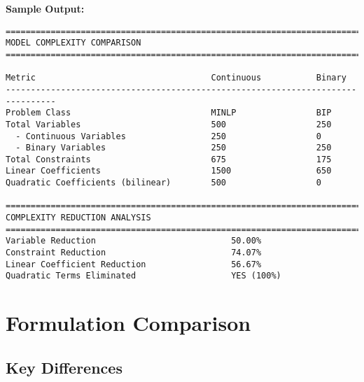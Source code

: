 \documentclass{article}
\begin{document}
\textbf{Sample Output:}
\begin{verbatim}
================================================================================
MODEL COMPLEXITY COMPARISON
================================================================================

Metric                                   Continuous           Binary              
--------------------------------------------------------------------------------
Problem Class                            MINLP                BIP                 
Total Variables                          500                  250                 
  - Continuous Variables                 250                  0                   
  - Binary Variables                     250                  250                 
Total Constraints                        675                  175                 
Linear Coefficients                      1500                 650                 
Quadratic Coefficients (bilinear)        500                  0                   

================================================================================
COMPLEXITY REDUCTION ANALYSIS
================================================================================
Variable Reduction                           50.00%
Constraint Reduction                         74.07%
Linear Coefficient Reduction                 56.67%
Quadratic Terms Eliminated                   YES (100%)
\end{verbatim}

\section{Formulation Comparison}

\subsection{Key Differences}
\end{document}
